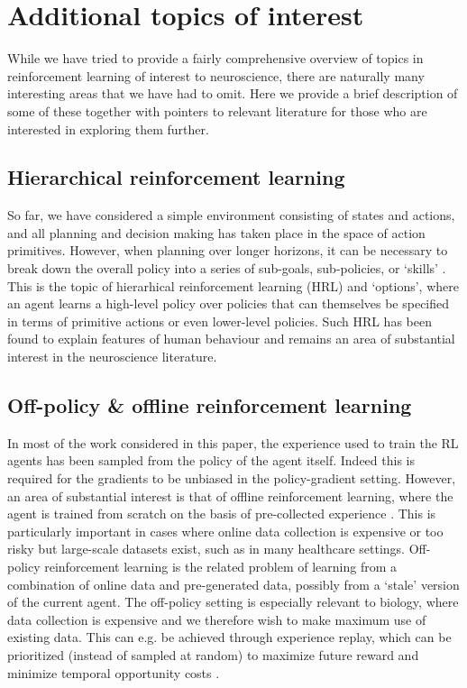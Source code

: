 \section{Additional topics of interest}
\label{sec:additional}

While we have tried to provide a fairly comprehensive overview of topics in reinforcement learning of interest to neuroscience, there are naturally many interesting areas that we have had to omit.
Here we provide a brief description of some of these together with pointers to relevant literature for those who are interested in exploring them further.

\subsection{Hierarchical reinforcement learning}
\label{sec:HRL}
So far, we have considered a simple environment consisting of states and actions, and all planning and decision making has taken place in the space of action primitives.
However, when planning over longer horizons, it can be necessary to break down the overall policy into a series of sub-goals, sub-policies, or `skills' \citep{sutton1999between, pateria2021hierarchical}.
This is the topic of hierarhical reinforcement learning (HRL) and `options', where an agent learns a high-level policy over policies that can themselves be specified in terms of primitive actions or even lower-level policies.
Such HRL has been found to explain features of human behaviour \citep{eckstein2020computational,botvinick2008hierarchical,botvinick2009hierarchically} and remains an area of substantial interest in the neuroscience literature.

\subsection{Off-policy \& offline reinforcement learning}
\label{sec:off-policy}
In most of the work considered in this paper, the experience used to train the RL agents has been sampled from the policy of the agent itself.
Indeed this is required for the gradients to be unbiased in the policy-gradient setting.
However, an area of substantial interest is that of offline reinforcement learning, where the agent is trained from scratch on the basis of pre-collected experience \citep{levine2020offline}.
This is particularly important in cases where online data collection is expensive or too risky but large-scale datasets exist, such as in many healthcare settings.
Off-policy reinforcement learning is the related problem of learning from a combination of online data and pre-generated data, possibly from a `stale' version of the current agent.
The off-policy setting is especially relevant to biology, where data collection is expensive and we therefore wish to make maximum use of existing data.
This can e.g. be achieved through experience replay, which can be prioritized (instead of sampled at random) to maximize future reward and minimize temporal opportunity costs \citep{mattar2018prioritized, agrawal2022temporal,schaul2015prioritized}.

